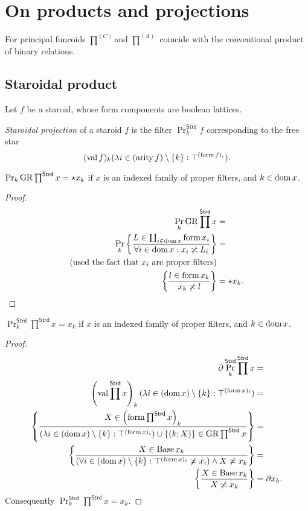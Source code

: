 \section{On products and projections}
\begin{conjecture}
For principal funcoids $\prod^{(C)}$and $\prod^{(A)}$ coincide with
the conventional product of binary relations.
\end{conjecture}

\subsection{Staroidal product}

Let $f$ be a staroid, whose form components are boolean lattices.
\begin{defn}
\emph{Staroidal projection} of a staroid
$f$ is the filter $\Pr_{k}^{\mathsf{Strd}}f$ corresponding to the
free star
\[
(\operatorname{val} f)_{k}(\lambda i\in(\operatorname{arity} f)\setminus\{k\}:\top^{(\operatorname{form} f)_{i}}).
\]
\end{defn}
\begin{prop}
$\Pr_{k}\operatorname{GR}\prod^{\mathsf{Strd}}x=\star x_{k}$ if $x$ is an indexed
family of proper filters, and $k\in\operatorname{dom} x$.\end{prop}
\begin{proof}
~
\begin{align*}
\Pr_{k}\operatorname{GR}\prod^{\mathsf{Strd}}x & =\\
\Pr_{k}\left\{ \frac{L\in\coprod_{i\in\operatorname{dom} x}\operatorname{form} x_{i}}{\forall i\in\operatorname{dom} x:x_{i}\not\asymp L_{i}}\right\} & =\\
\text{(used the fact that \ensuremath{x_{i}} are proper filters)}\\
\left\{ \frac{l\in\operatorname{form} x_{k}}{x_{k}\not\asymp l}\right\} & =\star x_{k}.
\end{align*}
\end{proof}
\begin{prop}
\label{Pr-prod-staroid}$\Pr_{k}^{\mathsf{Strd}}\prod^{\mathsf{Strd}}x=x_{k}$
if $x$ is an indexed family of proper filters, and $k\in\operatorname{dom} x$.\end{prop}
\begin{proof}
~
\begin{align*}
\partial\Pr_{k}^{\mathsf{Strd}}\prod^{\mathsf{Strd}}x & =\\
\left(\operatorname{val}\prod^{\mathsf{Strd}}x\right)_{k}(\lambda i\in(\operatorname{dom} x)\setminus\{k\}:\top^{(\operatorname{form} x)_{i}}) & =\\
\left\{ \frac{X\in\left(\operatorname{form}\prod^{\mathsf{Strd}}x\right)_{k}}{(\lambda i\in(\operatorname{dom} x)\setminus\{k\}:\top^{(\operatorname{form} x)_{i}})\cup\{(k;X)\}\in\operatorname{GR}\prod^{\mathsf{Strd}}x}\right\} & =\\
\left\{ \frac{X\in\operatorname{Base} x_{k}}{(\forall i\in(\operatorname{dom} x)\setminus\{k\}:\top^{(\operatorname{form} x)_{i}}\not\asymp x_{i})\land X\not\asymp x_{k}}\right\} & =\\
\left\{ \frac{X\in\operatorname{Base} x_{k}}{X\not\asymp x_{k}}\right\} & =\partial x_{k}.
\end{align*}
Consequently $\Pr_{k}^{\mathsf{Strd}}\prod^{\mathsf{Strd}}x=x_{k}$.
\end{proof}

